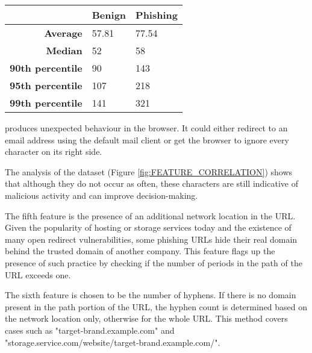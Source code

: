 \begin{singlespace}
	\begin{center}
		\begin{tabular}{  m{8em}  m{6em}  m{6em}  } \toprule

			                                             & \textbf{Benign} & \textbf{Phishing} \\ \midrule

			\multicolumn{1}{r}{\textbf{Average}}         & 57.81           & 77.54             \\

			\multicolumn{1}{r}{\textbf{Median}}          & 52              & 58                \\

			\multicolumn{1}{r}{\textbf{90th percentile}} & 90              & 143               \\

			\multicolumn{1}{r}{\textbf{95th percentile}} & 107             & 218               \\

			\multicolumn{1}{r}{\textbf{99th percentile}} & 141             & 321               \\ \bottomrule
		\end{tabular}
		\captionsetup{type=table}\caption{Statistical analysis of URL length over the training dataset}
		\label{tab:URL_SIZE_ANALISYS}
	\end{center}
\end{singlespace}

{\parindent0pt produces unexpected behaviour in the browser. It could either redirect to an email address using the default mail client or get the browser to ignore every character on its right side.}

The analysis of the dataset (Figure \ref{fig:FEATURE_CORRELATION}) shows that although they do not occur as often, these characters are still indicative of malicious activity and can improve decision-making.

The fifth feature is the presence of an additional network location in the URL. Given the popularity of hosting or storage services today and the existence of many open redirect vulnerabilities, some phishing URLs hide their real domain behind the trusted domain of another company. This feature flags up the presence of such practice by checking if the number of periods in the path of the URL exceeds one.

The sixth feature is chosen to be the number of hyphens. If there is no domain present in the path portion of the URL, the hyphen count is determined based on the network location only, otherwise for the whole URL. This method covers cases such as "target-brand.example.com" and "storage.service.com/website/target-brand.example.com/".

